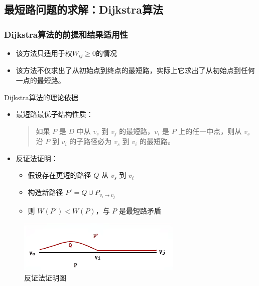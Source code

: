 	\subsection{最短路问题的求解：Dijkstra算法}
	\subsubsection{Dijkstra算法的前提和结果适用性}
	\begin{itemize}
		\item 该方法只适用于权$W_{ij} \geq 0$的情况
		\item 该方法不仅求出了从初始点到终点的最短路，实际上它求出了从初始点到任何一点的最短路。
	\end{itemize}
	
	\begin{thmbox}{Dijkstra算法的理论依据}{}
	\begin{itemize}
		\item 最短路最优子结构性质：
		\begin{quote}
			如果 $P$ 是 $D$ 中从 $v_s$ 到 $v_j$ 的最短路，$v_i$ 是 $P$ 上的任一中点，则从 $v_s$ 沿 $P$ 到 $v_i$ 的子路径必为 $v_s$ 到 $v_i$ 的最短路。
		\end{quote}
		\item 反证法证明：
		\begin{itemize}
			\item 假设存在更短的路径 $Q$ 从 $v_s$ 到 $v_i$
			\item 构造新路径 $P' = Q \cup P_{v_i \to v_j}$
			\item 则 $W(P') < W(P)$，与 $P$ 是最短路矛盾
		\end{itemize}
	\end{itemize}
	\begin{figure}[H]
		\centering
		\includegraphics[width=0.7\textwidth]{./image/39.png}
		\caption{反证法证明图}
		\label{fig:Chapter4_Temporary_Pavilion_1}
	\end{figure}
	\end{thmbox}

